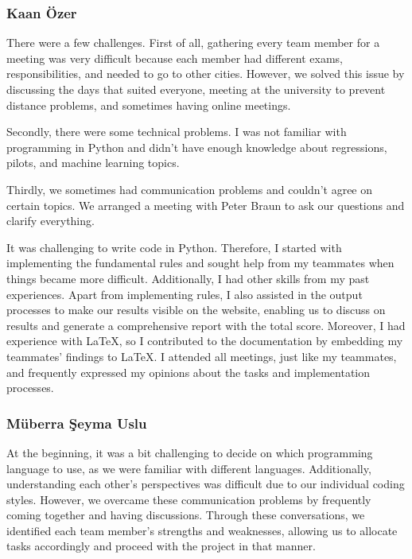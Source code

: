 \subsubsection{Kaan Özer}


There were a few challenges. First of all, gathering every team member for a meeting was very difficult because each member had different exams, responsibilities, and needed to go to other cities. However, we solved this issue by discussing the days that suited everyone, meeting at the university to prevent distance problems, and sometimes having online meetings. 

\vspace{\baselineskip}

Secondly, there were some technical problems. I was not familiar with programming in Python and didn't have enough knowledge about regressions, pilots, and machine learning topics.

\vspace{\baselineskip}

Thirdly, we sometimes had communication problems and couldn't agree on certain topics. We arranged a meeting with Peter Braun to ask our questions and clarify everything.

\vspace{\baselineskip}

It was challenging to write code in Python. Therefore, I started with implementing the fundamental rules and sought help from my teammates when things became more difficult. Additionally, I had other skills from my past experiences. Apart from implementing rules, I also assisted in the output processes to make our results visible on the website, enabling us to discuss on results and generate a comprehensive report with the total score. Moreover, I had experience with LaTeX, so I contributed to the documentation by embedding my teammates' findings to LaTeX. I attended all meetings, just like my teammates, and frequently expressed my opinions about the tasks and implementation processes.


\subsubsection{Müberra Şeyma Uslu}

At the beginning, it was a bit challenging to decide on which programming language to use, as we were familiar with different languages. Additionally, understanding each other's perspectives was difficult due to our individual coding styles. However, we overcame these communication problems by frequently coming together and having discussions. Through these conversations, we identified each team member's strengths and weaknesses, allowing us to allocate tasks accordingly and proceed with the project in that manner.


